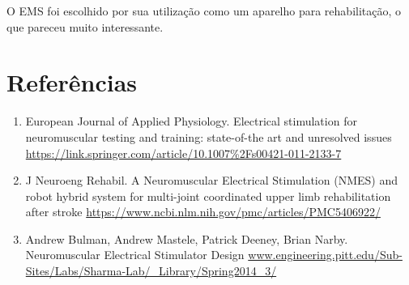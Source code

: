 \documentclass{article}
\begin{document}
        O EMS foi escolhido por sua utilização como um aparelho para 
        rehabilitação, o que pareceu muito interessante.

    \newpage
    \section{Referências}
        \begin{enumerate}
            \item European Journal of Applied Physiology.
                Electrical stimulation for neuromuscular testing and training: state-of-the art and unresolved issues 
                \url{https://link.springer.com/article/10.1007%2Fs00421-011-2133-7}
            \item J Neuroeng Rehabil.
                A Neuromuscular Electrical Stimulation (NMES) and robot hybrid system for multi-joint coordinated upper limb rehabilitation after stroke
                \url{https://www.ncbi.nlm.nih.gov/pmc/articles/PMC5406922/}
            \item Andrew Bulman, Andrew Mastele, Patrick Deeney, Brian Narby.
                Neuromuscular Electrical Stimulator Design
                \url{www.engineering.pitt.edu/Sub-Sites/Labs/Sharma-Lab/_Library/Spring2014_3/}
        \end{enumerate}
\end{document}
